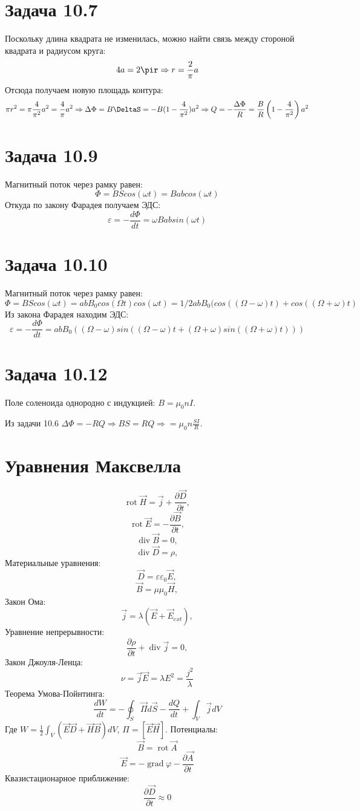 \documentclass[11pt]{article}
\begin{document}
\section{Задача 10.7}
\label{sec:orga954d30}
Поскольку длина квадрата не изменилась, можно найти связь между стороной квадрата и радиусом круга:
$$4a = 2\pir \Rightarrow r = \frac{2}{\pi}a$$
Отсюда получаем новую площадь контура:
$$\pi r^2 = \pi\frac{4}{\pi^2}a^2 = \frac{4}{\pi}a^2 \Rightarrow \Delta\Phi = B\DeltaS = -B(1 - \frac{4}{\pi^2})a^2 \Rightarrow Q = -\frac{\Delta\Phi}{R} = \frac{B}{R}\left(1 - \frac{4}{\pi^2}\right)a^2$$
\section{Задача 10.9}
\label{sec:org1f46239}
Магнитный поток через рамку равен:
$$\Phi = BScos(\omega t) = Babcos(\omega t)$$
Откуда по закону Фарадея получаем ЭДС:
$$\varepsilon = -\frac{d\Phi}{dt} = \omega Babsin(\omega t)$$
\section{Задача 10.10}
\label{sec:org9b478ef}
Магнитный поток через рамку равен:
$$\Phi = BScos(\omega t) = abB_0cos(\Omega t)cos(\omega t) = 1/2abB_0(cos((\Omega - \omega)t) + cos((\Omega + \omega)t)$$
Из закона Фарадея находим ЭДС:
$$\varepsilon = -\frac{d\Phi}{dt} = abB_0((\Omega - \omega)sin((\Omega - \omega)t + (\Omega + \omega)sin((\Omega + \omega)t)))$$
\section{Задача 10.12}
\label{sec:orge69c409}
Поле соленоида однородно с индукцией: \(B = \mu_0nI\).

Из задачи 10.6 \(\Delta\Phi = -RQ \Rightarrow BS = RQ \Rightarrow = \mu_0n\frac{SI}{R}\).
\section{Уравнения Максвелла}
\label{sec:orgd901d98}
$$\operatorname{rot} \vec H = \vec j + \frac{\partial \vec D}{\partial t},$$
$$\operatorname{rot} \vec E = -\frac{\partial \vec B}{\partial t},$$
$$\operatorname{div} \vec B = 0,$$
$$\operatorname{div} \vec D = \rho,$$
Материальные уравнения:
$$\vec D = \varepsilon\varepsilon_0\vec E,$$
$$\vec B = \mu\mu_0\vec H,$$
Закон Ома:
$$\vec j = \lambda(\vec E + \vec E_{ext}),$$
Уравнение непрерывности:
$$\frac{\partial\rho}{\partial t} + \operatorname{div}\vec j = 0,$$
Закон Джоуля-Ленца:
$$\nu = \vec j \vec E = \lambda E^2 = \frac{j^2}{\lambda}$$
Теорема Умова-Пойнтинга:
$$\frac{dW}{dt} = -\oint_S\vec\Pi d\vec S - \frac{dQ}{dt} + \int_V \vec j dV$$
Где \(W = \frac{1}2\int_V(\vec E\vec D + \vec H\vec B)dV\), \(\Pi = [\vec E\vec H]\).
Потенциалы:
$$\vec B = \operatorname{rot}\vec A$$
$$\vec E = -\operatorname{grad}\varphi - \frac{\partial\vec A}{\partial t}$$
Квазистационарное приближение:
$$\frac{\partial \vec D}{\partial t} \approx 0$$
\end{document}
